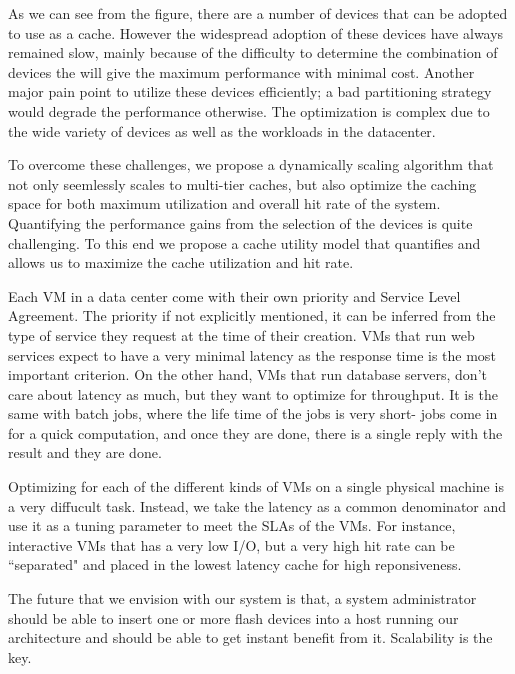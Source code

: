 As we can see from the figure, there are a number of devices that can be adopted to use as a cache. However the widespread adoption of these devices have always remained slow, mainly because of the difficulty to determine the combination of devices the will give the maximum performance with minimal cost. Another major pain point to utilize these devices efficiently; a bad partitioning strategy would degrade the performance otherwise. The optimization is complex due to the wide variety of devices as well as the workloads in the datacenter.

To overcome these challenges, we propose a dynamically scaling algorithm that not only seemlessly scales to multi-tier caches, but also optimize the caching space for both maximum utilization and overall hit rate of the system. Quantifying the performance gains from the selection of the devices is quite challenging. To this end we propose a cache utility model that quantifies and allows us to maximize the cache utilization and hit rate.

Each VM in a data center come with their own priority and Service Level Agreement. The priority if not explicitly mentioned, it can be inferred from the type of service they request at the time of their creation. VMs that run web services expect to have a very minimal latency as the response time is the most important criterion. On the other hand, VMs that run database servers, don't care about latency as much, but they want to optimize for throughput. It is the same with batch jobs, where the life time of the jobs is very short- jobs come in for a quick computation, and once they are done, there is a single reply with the result and they are done.

Optimizing for each of the different kinds of VMs on a single physical machine is a very diffucult task. Instead, we take the latency as a common denominator and use it as a tuning parameter to meet the SLAs of the VMs. For instance, interactive VMs that has a very low I/O, but a very high hit rate can be ``separated" and placed in the lowest latency cache for high reponsiveness. 

The future that we envision with our system is that, a system administrator should be able to insert one or more flash devices into a host running our architecture and should be able to get instant benefit from it. Scalability is the key.
